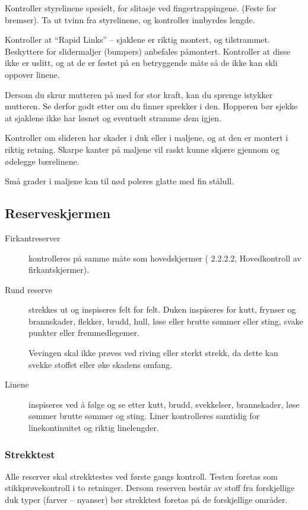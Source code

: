 Kontroller styrelinene spesielt, for slitasje ved fingertrappingene. (Feste for bremser). Ta ut tvinn fra styrelinene, og kontroller innbyrdes lengde.

Kontroller at ``Rapid Links'' – sjaklene er riktig montert, og tilstrammet. Beskyttere for slidermaljer (bumpers) anbefales påmontert. Kontroller at disse ikke er uslitt, og at de er festet på en betryggende måte så de ikke kan skli oppover linene.

Dersom du skrur mutteren på med for stor kraft, kan du sprenge istykker mutteren. Se derfor godt etter om du finner sprekker i den. Hopperen bør sjekke at sjaklene ikke har løsnet og eventuelt stramme dem igjen.

Kontroller om slideren har skader i duk eller i maljene, og at den er montert i riktig retning. Skarpe kanter på maljene vil raskt kunne skjære gjennom og ødelegge bærelinene.

Små grader i maljene kan til nød poleres glatte med fin stålull.

\subsection{Reserveskjermen}
\begin{description}
	\item[Firkantreserver] kontrolleres på samme måte som hovedskjermer ( 2.2.2.2, Hovedkontroll av firkantskjermer).

	\item[Rund reserve] strekkes ut og inspiseres felt for felt. Duken inspiseres for kutt, frynser og brannskader, flekker, brudd, hull, løse eller brutte sømmer eller sting, svake punkter eller fremmedlegemer.

	Vevingen skal ikke prøves ved riving eller sterkt strekk, da dette kan svekke stoffet eller øke skadens omfang.

	\item[Linene] inspiseres ved å følge og se etter kutt, brudd, svekkelser, brannskader, løse sømmer brutte sømmer og sting. Liner kontrolleres samtidig for linekontinuitet og riktig linelengder.
\end{description}

\subsubsection{Strekktest}
Alle reserver skal strekktestes ved første gangs kontroll. Testen foretas som stikkprøvekontroll i to retninger. Dersom reserven består av stoff fra forskjellige duk typer (farver – nyanser) bør strekktest foretas på de forskjellige områder.

